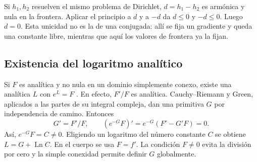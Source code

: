 Si $h_1,h_2$ resuelven el mismo problema de Dirichlet, $d=h_1-h_2$ es armónica y nula en la frontera. Aplicar el principio a $d$ y a $-d$ da $d\le0$ y $-d\le0$. Luego $d=0$. Esta unicidad no es la de una conjugada: allí se fija un gradiente y queda una constante libre, mientras que aquí los valores de frontera ya la fijan.

\subsection{Existencia del logaritmo analítico}\label{an:log}
Si $F$ es analítica y no nula en un dominio simplemente conexo, existe una analítica $L$ con $e^L=F$ \cite{ahlfors1979}. En efecto, $F'/F$ es analítica. Cauchy--Riemann y Green, aplicados a las partes de su integral compleja, dan una primitiva $G$ por independencia de camino. Entonces
\begin{equation}
 G'=F'/F,\qquad (e^{-G}F)'=e^{-G}(F'-G'F)=0.
 \label{eq:existencia_log}
\end{equation}
Así, $e^{-G}F=C\ne0$. Eligiendo un logaritmo del número constante $C$ se obtiene $L=G+\operatorname{Ln}C$. En el cuerpo se usa $F=f'$. La condición $F\ne0$ evita la división por cero y la simple conexidad permite definir $G$ globalmente.
